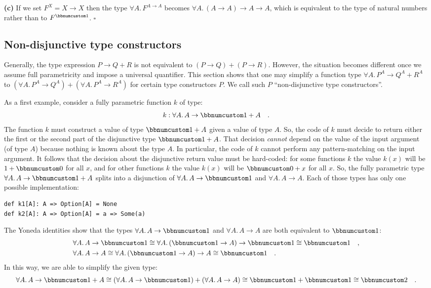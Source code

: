 \textbf{(c)} If we set $F^{X}=X\rightarrow X$ then the type $\forall A.\,F^{A\rightarrow A}$
becomes $\forall A.\,(A\rightarrow A)\rightarrow A\rightarrow A$,
which is equivalent to the type of natural numbers rather than to
$F^{\bbnum 1}$. $\square$

\subsection{Non-disjunctive type constructors}

Generally, the type expression $P\rightarrow Q+R$ is not equivalent
to $(P\rightarrow Q)+(P\rightarrow R)$. However, the situation becomes
different once we assume full parametricity and impose a universal
quantifier. This section shows that one may simplify a function type
$\forall A.\,P^{A}\rightarrow Q^{A}+R^{A}$ to $(\forall A.\,P^{A}\rightarrow Q^{A})+(\forall A.\,P^{A}\rightarrow R^{A})$
for certain type constructors $P$. We call such $P$ \textsf{``}non-disjunctive
type constructors\textsf{''}.

As a first example, consider a fully parametric function $k$ of type:
\[
k:\forall A.\,A\rightarrow\bbnum 1+A\quad.
\]
The function $k$ must construct a value of type $\bbnum 1+A$ given
a value of type $A$. So, the code of $k$ must decide to return either
the first or the second part of the disjunctive type $\bbnum 1+A$.
That decision \emph{cannot} depend on the value of the input argument
(of type $A$) because nothing is known about the type $A$. In particular,
the code of $k$ cannot perform any pattern-matching on the input
argument. It follows that the decision about the disjunctive return
value must be hard-coded: for some functions $k$ the value $k(x)$
will be $1+\bbnum 0$ for all $x$, and for other functions $k$ the
value $k(x)$ will be $\bbnum 0+x$ for all $x$. So, the fully parametric
type $\forall A.\,A\rightarrow\bbnum 1+A$ splits into a disjunction
of $\forall A.\,A\rightarrow\bbnum 1$ and $\forall A.\,A\rightarrow A$.
Each of those types has only one possible implementation:
\begin{lstlisting}
def k1[A]: A => Option[A] = None
def k2[A]: A => Option[A] = a => Some(a)
\end{lstlisting}
The Yoneda identities show that the types $\forall A.\,A\rightarrow\bbnum 1$
and $\forall A.\,A\rightarrow A$ are both equivalent to $\bbnum 1$:
\begin{align*}
 & \forall A.\,A\rightarrow\bbnum 1\cong\forall A.\,(\bbnum 1\rightarrow A)\rightarrow\bbnum 1\cong\bbnum 1\quad,\\
 & \forall A.\,A\rightarrow A\cong\forall A.\,(\bbnum 1\rightarrow A)\rightarrow A\cong\bbnum 1\quad.
\end{align*}
In this way, we are able to simplify the given type:
\[
\forall A.\,A\rightarrow\bbnum 1+A\cong(\forall A.\,A\rightarrow\bbnum 1)+(\forall A.\,A\rightarrow A)\cong\bbnum 1+\bbnum 1\cong\bbnum 2\quad.
\]

